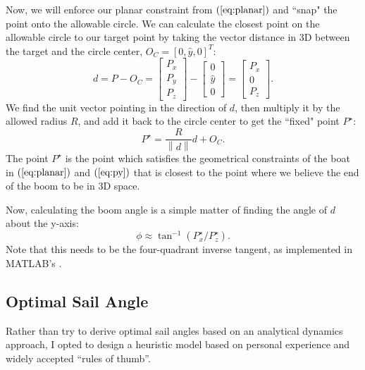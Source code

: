\documentclass[letterpaper, 10 pt, conference]{ieeeconf}  %
\newcommand{\eq}[1]{$\left(\ref{eq:#1}\right)$}
\newcommand{\norm}[1]{\left\lVert #1 \right\rVert}
\begin{document}
Now, we will enforce our planar constraint from \eq{planar} and ``snap" the point onto the allowable circle. We can calculate the closest point on the allowable circle to our target point by taking the vector distance in 3D between the target and the circle center, $O_C = [0, \hat{y}, 0]^T$: 
\[
d = P - O_C = \left[\begin{array}{c}P_x \\P_y \\P_z \end{array}\right] - \left[\begin{array}{c}0 \\ \hat{y} \\ 0\end{array}\right] = \left[\begin{array}{c}P_x\\ 0 \\ P_z\end{array}\right].
\]
We find the unit vector pointing in the direction of $d$, then multiply it by the allowed radius $R$, and add it back to the circle center to get the ``fixed" point $P^\star$:
\[
P^\star = \frac{R}{\norm{d}}d + O_C.
\]
The point $P^\star$ is the point which satisfies the geometrical constraints of the boat in \eq{planar} and \eq{py} that is closest to the point where we believe the end of the boom to be in 3D space.

Now, calculating the boom angle is a simple matter of finding the angle of $d$ about the y-axis:
\[
\phi \approx \tan^{-1}\left({P^\star_x/P^\star_z}\right).
\]
Note that this needs to be the four-quadrant inverse tangent, as implemented in MATLAB's .


\subsection{Optimal Sail Angle}
\label{sec:optimal}
Rather than try to derive optimal sail angles based on an analytical dynamics approach, I opted to design a heuristic model based on personal experience and widely accepted ``rules of thumb''. 
\end{document}
